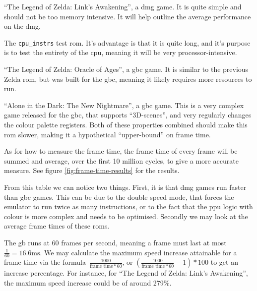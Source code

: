 \documentclass[11pt]{informatics-report}
\begin{document}
\begin{compactitem}
	\item ``The Legend of Zelda: Link's Awakening'', a \gls{dmg} game. It is quite simple and should not be too memory intensive. It will help outline the average performance on the \gls{dmg}.
	\item The \texttt{cpu\_instrs} test \gls{rom}. It's advantage is that it is quite long, and it's purpose is to test the entirety of the \gls{cpu}, meaning it will be very processor-intensive.
	\item ``The Legend of Zelda: Oracle of Ages'', a \gls{gbc} game. It is similar to the previous Zelda \gls{rom}, but was built for the \gls{gbc}, meaning it likely requires more resources to run.
	\item ``Alone in the Dark: The New Nightmare'', a \gls{gbc} game. This is a very complex game released for the \gls{gbc}, that supports ``3D-scenes'', and very regularly changes the colour palette registers\cite[Tricky-to-emulate games]{gbdev_wiki}. Both of these properties combined should make this \gls{rom} slower, making it a hypothetical ``upper-bound'' on frame time.
\end{compactitem}

As for how to measure the frame time, the frame time of every frame will be summed and average, over the first 10 million cycles, to give a more accurate measure. See figure \ref{fig:frame-time-results} for the results.

From this table we can notice two things. First, it is that \gls{dmg} games run faster than \gls{gbc} games. This can be due to the double speed mode, that forces the emulator to run twice as many instructions, or to the fact that the \gls{ppu} logic with colour is more complex and needs to be optimised. Secondly we may look at the average frame times of these \glspl{rom}.

The \gls{gb} runs at 60 frames per second, meaning a frame must last at most $\frac{1}{60}=16.6\text{ms}$. We may calculate the maximum speed increase attainable for a frame time via the formula~$\frac{1000}{\text{frame time} * 60}$, or $(\frac{1000}{\text{frame time} * 60}-1)*100$ to get an increase percentage. For instance, for ``The Legend of Zelda: Link's Awakening'', the maximum speed increase could be of around 279\%.
\end{document}
